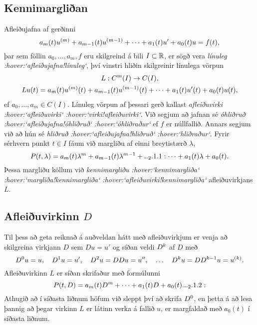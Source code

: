 \subsection*{Kennimargliðan}

Afleiðujafna af gerðinni
 $$a_m(t)u\sp{(m)}+a_{m-1}(t)u\sp{(m-1)}+\cdots+a_1(t)u'+a_0(t)u=f(t),
 $$
þar sem föllin $a_0,\dots,a_m,f$ eru skilgreind á bili $I\subset {\mathbb R}$,
er sögð vera {\it línuleg :hover:`afleiðujafna!línuleg`}, því vinstri
hliðin skilgreinir línulega vörpun
\begin{gather*}
L:C\sp m(I)\to C(I),\\
Lu(t)=
a_m(t)u\sp{(m)}(t)+a_{m-1}(t)u\sp{(m-1)}(t)+
\cdots+a_1(t)u'(t)+a_0(t)u(t),
\end{gather*}
ef $a_0,\dots,a_m\in C(I)$.
Línuleg vörpun af þessari gerð  kallast {\it
afleiðuvirki :hover:`afleiðuvirki` :hover:`virki!afleiðuvirki`}.  
Við segjum að jafnan sé {\it
óhliðruð :hover:`afleiðujafna!óhliðruð` :hover:`óhliðraður`} ef $f$ er núllfallið.
Annars segjum við að hún sé {\it
hliðruð :hover:`afleiðujafna!hliðruð` :hover:`hliðraður`}.
Fyrir sérhvern punkt $t\in I$ fáum við margliðu af einni breytistærð
$\lambda$,
 \begin{equation*}
P(t,\lambda)= a_m(t)\lambda\sp{m}+a_{m-1}(t)\lambda\sp{m-1}+

.. _2.1.1:

\cdots+a_1(t)\lambda+a_0(t).
 \end{equation*}
Þessa margliðu köllum við {\it
kennimargliðu :hover:`kennimargliða` :hover:`margliða!kennimargliða`
 :hover:`afleiðuvirki!kennimargliða`} afleiðuvirkjans $L$.


\subsection*{Afleiðuvirkinn $D$}

Til þess að geta reiknað á auðveldan hátt með afleiðuvirkjum er venja að
skilgreina virkjann $D$ sem $Du=u'$ og síðan veldi $D\sp k$ af $D$ með
$$
D\sp 0u=u, \quad D\sp 1u=u', \quad
D\sp 2u=DDu=u{\sp{\prime\prime}}, \quad \dots \quad D\sp ku= D D\sp
{k-1}u=u\sp{(k)}. 
$$
Afleiðuvirkinn $L$ er síðan  skrifaður með formúlunni
 \begin{equation*}P(t,D)=a_m(t)D\sp m+\cdots+a_1(t)D+a_0(t).

.. _2.1.2:

 \end{equation*}
Athugið að í síðasta liðnum höfum við sleppt því að skrifa $D\sp 0$,
en þetta á að lesa þannig að þegar virkinn $L$ er látinn verka á fallið $u$,
er margfaldað með $a_0(t)$ í síðasta liðnum.  

